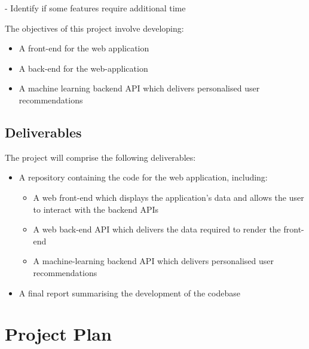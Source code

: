 - Identify if some features require additional time 

The objectives of this project involve developing:

\begin{itemize}
    \item A front-end for the web application
    \item A back-end for the web-application
    \item A machine learning backend API which delivers personalised user recommendations

\end{itemize}

\subsection{Deliverables}


The project will comprise the following deliverables:
\begin{itemize}
    \item A repository containing the code for the web application, including:
        \begin{itemize}
            \item A web front-end which displays the application's data and allows the user to interact with the backend APIs
            \item A web back-end API which delivers the data required to render the front-end
            \item A machine-learning backend API which delivers personalised user recommendations 
        \end{itemize}
    \item A final report summarising the development of the codebase
\end{itemize}

%   
%
\section{Project Plan}


